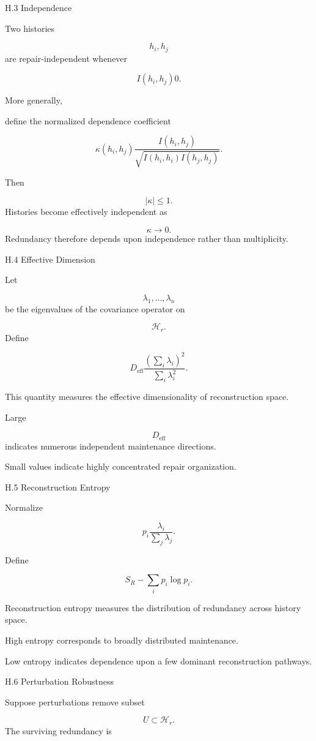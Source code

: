 \documentclass[12pt,oneside]{article}
\theoremstyle{plain}
\theoremstyle{definition}
\theoremstyle{remark}
\begin{document}
H.3 Independence

Two histories

\[
h_i,
h_j
\]
are repair-independent whenever

\[
I(h_i,h_j)
0. 

\]

More generally,

define the normalized dependence coefficient

\[
\kappa(h_i,h_j)
\frac{
I(h_i,h_j)
}
{
\sqrt{
I(h_i,h_i)
I(h_j,h_j)
}
}.
\]

Then

\[
|\kappa|
\le1.
\]
Histories become effectively independent as

\[
\kappa
\rightarrow0.
\]
Redundancy therefore depends upon independence rather than multiplicity.


H.4 Effective Dimension

Let

\[
\lambda_1,\ldots,\lambda_n
\]
be the eigenvalues of the covariance operator on

\[
\mathcal H_r.
\]
Define

\[
D_{\mathrm{eff}}
\frac{
(\sum_i\lambda_i)^2
}
{
\sum_i\lambda_i^2
}.
\]

This quantity measures the effective dimensionality of reconstruction space.

Large

\[
D_{\mathrm{eff}}
\]
indicates numerous independent maintenance directions.

Small values indicate highly concentrated repair organization.


H.5 Reconstruction Entropy

Normalize

\[
p_i
\frac{\lambda_i}
{\sum_j\lambda_j}.
\]

Define

\[
S_R
- 

\sum_i
p_i
\log p_i.
\]

Reconstruction entropy measures the distribution of redundancy across history space.

High entropy corresponds to broadly distributed maintenance.

Low entropy indicates dependence upon a few dominant reconstruction pathways.


H.6 Perturbation Robustness

Suppose perturbations remove subset

\[
U
\subset
\mathcal H_r.
\]
The surviving redundancy is
\end{document}
